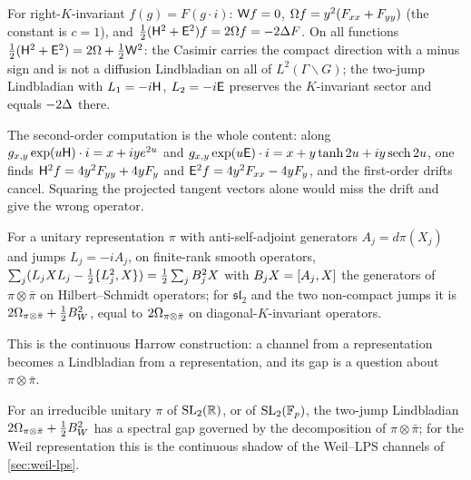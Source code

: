 \begin{proposition}
\label{prop:casimir-laplacian}
For right-$K$-invariant $f(g) = F(g\cdot i)$: $\mathsf W f = 0$,
$\Omega f = y^2(F_{xx}+F_{yy})$ (the constant is $c = 1$), and
$\tfrac12(\mathsf H^2+\mathsf E^2)f = 2\Omega f = -2\Delta F$. On all functions
$\tfrac12(\mathsf H^2+\mathsf E^2) = 2\Omega + \tfrac12\mathsf W^2$: the Casimir carries
the compact direction with a minus sign and is not a diffusion Lindbladian
on all of $L^2(\Gamma\backslash G)$; the two-jump Lindbladian with
$L_1 = -i\mathsf H$, $L_2 = -i\mathsf E$ preserves the $K$-invariant sector and
equals $-2\Delta$ there.
\end{proposition}

The second-order computation is the whole content: along
$g_{x,y}\exp(u\mathsf H)\cdot i = x+iye^{2u}$ and $g_{x,y}\exp(u\mathsf E)\cdot i =
x + y\tanh 2u + iy\,\mathrm{sech}\,2u$, one finds $\mathsf H^2f = 4y^2F_{yy}+4yF_y$
and $\mathsf E^2f = 4y^2F_{xx}-4yF_y$, and the first-order drifts cancel.
Squaring the projected tangent vectors alone would miss the drift and give
the wrong operator.

\begin{proposition}
\label{prop:quantum-lindblad-tensor}
For a unitary representation $\pi$ with anti-self-adjoint generators
$A_j = d\pi(X_j)$ and jumps $L_j = -iA_j$, on finite-rank smooth operators,
$\sum_j(L_jX L_j - \tfrac12\{L_j^2,X\}) = \tfrac12\sum_jB_j^2X$ with
$B_jX = [A_j,X]$ the generators of $\pi\otimes\bar\pi$ on
Hilbert--Schmidt operators; for $\mathfrak{sl}_2$ and the two non-compact
jumps it is $2\Omega_{\pi\otimes\bar\pi} + \tfrac12B_W^2$, equal to
$2\Omega_{\pi\otimes\bar\pi}$ on diagonal-$K$-invariant operators.
\end{proposition}

This is the continuous Harrow construction: a channel from a representation
becomes a Lindbladian from a representation, and its gap is a question about
$\pi\otimes\bar\pi$.

\begin{conjecture}
\label{conj:quantum-lindblad-gap}
For an irreducible unitary $\pi$ of $\mathrm{SL}_2(\mathbb R)$, or of $\mathrm{SL}_2(\mathbb F_p)$, the
two-jump Lindbladian $2\Omega_{\pi\otimes\bar\pi}+\tfrac12B_W^2$ has a spectral
gap governed by the decomposition of $\pi\otimes\bar\pi$; for the Weil
representation this is the continuous shadow of the Weil--LPS channels of
\cref{sec:weil-lps}.
\end{conjecture}
